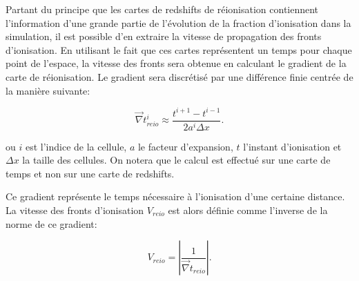 Partant du principe que les cartes de redshifts de réionisation contiennent l'information d'une grande partie de l'évolution de la fraction d'ionisation dans la simulation, il est possible d'en extraire la vitesse de propagation des fronts d'ionisation.
En utilisant le fait que ces cartes représentent un temps pour chaque point de l'espace, la vitesse des fronts sera obtenue en calculant le gradient de la carte de réionisation.
Le gradient sera discrétisé par une différence finie centrée de la manière suivante:

\begin{equation}
\vec{\nabla} t_{reio}^i \approx \frac{t^{i+1}  - t^{i-1}}{2a^i \Delta x }. %
\end{equation}

ou $i$ est l'indice de la cellule, $a$ le facteur d'expansion, $t$ l'instant d'ionisation et $\Delta x$ la taille des cellules.
On notera que le calcul est effectué sur une carte de temps et non sur une carte de redshifts.

Ce gradient représente le temps nécessaire à l'ionisation d'une certaine distance.
La vitesse des fronts d'ionisation $V_{reio}$ est alors définie comme l'inverse de la norme de ce gradient:

\begin{equation}
V_{reio}  = \left | \frac{1}{ \vec{\nabla} t_{reio}} \right| .
\end{equation}

